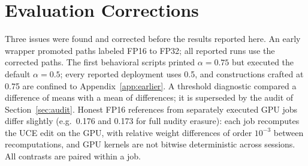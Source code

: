 \section{Evaluation Corrections}
\label{app:corrections}
Three issues were found and corrected before the results reported here. An early
wrapper promoted paths labeled FP16 to FP32; all reported runs use the corrected
paths. The first behavioral scripts printed $\alpha=0.75$ but executed the default
$\alpha=0.5$; every reported deployment uses 0.5, and constructions crafted at 0.75
are confined to Appendix~\ref{app:earlier}. A threshold diagnostic compared a
difference of means with a mean of differences; it is superseded by the audit of
Section~\ref{sec:audit}. Honest FP16 references from separately executed GPU jobs
differ slightly (e.g.\ 0.176 and 0.173 for full nudity erasure): each job recomputes
the UCE edit on the GPU, with relative weight differences of order $10^{-3}$ between
recomputations, and GPU kernels are not bitwise deterministic across sessions. All
contrasts are paired within a job.
